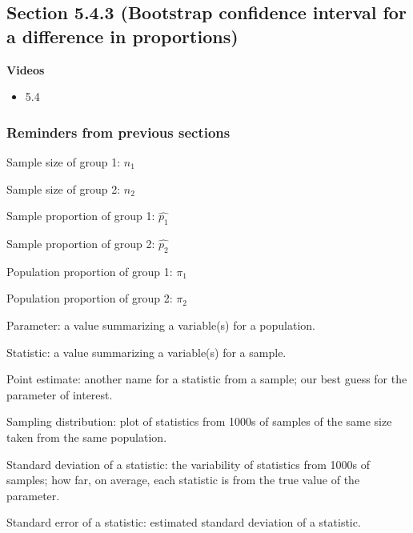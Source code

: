 \documentclass[
]{report}
\providecommand{\tightlist}{%
  \setlength{\itemsep}{0pt}\setlength{\parskip}{0pt}}
\begin{document}
\hypertarget{section-5.4.3-bootstrap-confidence-interval-for-a-difference-in-proportions}{%
\subsection*{Section 5.4.3 (Bootstrap confidence interval for a difference in proportions)}\label{section-5.4.3-bootstrap-confidence-interval-for-a-difference-in-proportions}}

\textbf{Videos}

\begin{itemize}
\tightlist
\item
  5.4
\end{itemize}


\hypertarget{reminders-from-previous-sections-3}{%
\subsubsection*{Reminders from previous sections}\label{reminders-from-previous-sections-3}}

Sample size of group 1: \(n_1\)

Sample size of group 2: \(n_2\)

Sample proportion of group 1: \(\hat{p_1}\)

Sample proportion of group 2: \(\hat{p_2}\)

Population proportion of group 1: \(\pi_1\)

Population proportion of group 2: \(\pi_2\)

Parameter: a value summarizing a variable(s) for a population.

Statistic: a value summarizing a variable(s) for a sample.

Point estimate: another name for a statistic from a sample; our best guess for the parameter of interest.

Sampling distribution: plot of statistics from 1000s of samples of the same size taken from the same population.

Standard deviation of a statistic: the variability of statistics from 1000s of samples; how far, on average, each statistic is from the true value of the parameter.

Standard error of a statistic: estimated standard deviation of a statistic.
\end{document}
